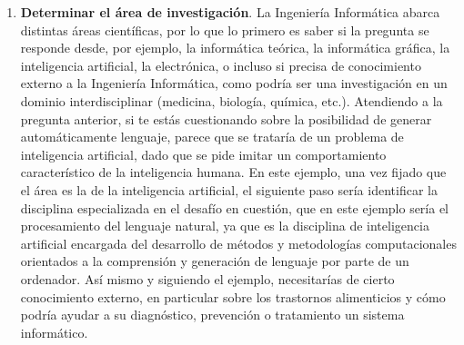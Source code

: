 \begin{enumerate}
    \item \textbf{Determinar el área de investigación}. La Ingeniería Informática abarca distintas áreas científicas, por lo que lo primero es saber si la pregunta se responde desde, por ejemplo, la informática teórica, la informática gráfica, la inteligencia artificial, la electrónica, o incluso si precisa de conocimiento externo a la Ingeniería Informática, como podría ser una investigación en un dominio interdisciplinar (medicina, biología, química, etc.). Atendiendo a la pregunta anterior, si te estás  cuestionando sobre la posibilidad de generar automáticamente lenguaje, parece que se trataría de un problema de inteligencia artificial, dado que se pide imitar un comportamiento característico de la inteligencia humana. En este ejemplo, una vez fijado que el área es la de la inteligencia artificial, el siguiente paso sería identificar la disciplina especializada en el desafío en cuestión, que en este ejemplo sería el procesamiento del lenguaje natural, ya que es la disciplina de inteligencia artificial encargada del desarrollo de métodos y metodologías computacionales orientados a la comprensión y generación de lenguaje por parte de un ordenador. Así mismo y siguiendo el ejemplo, necesitarías de cierto conocimiento externo, en particular sobre los trastornos alimenticios y cómo podría ayudar a su diagnóstico, prevención o tratamiento un sistema informático.


\end{enumerate}
